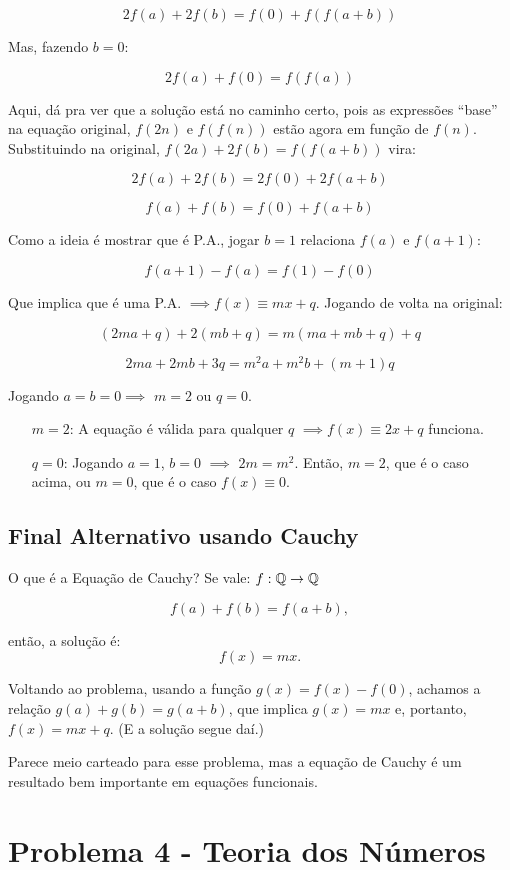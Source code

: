 \documentclass[10pt,a4paper]{article}
\begin{document}
	$$2f(a) + 2f(b) = f(0) + f(f(a+b))$$

	Mas, fazendo $b=0$:

	$$2f(a) + f(0) = f(f(a))$$

	Aqui, dá pra ver que a solução está no caminho certo, pois as expressões ``base'' na equação original, $f(2n)$ e $f(f(n))$ estão agora em função de $f(n)$. Substituindo na original, $f(2a) + 2f(b) = f(f(a + b))$ vira:

	$$2f(a) + 2f(b) = 2f(0) + 2f(a+b)$$

	$$f(a) + f(b) = f(0) + f(a+b)$$

	Como a ideia é mostrar que é P.A., jogar $b=1$ relaciona $f(a)$ e $f(a+1)$:

	$$f(a+1) - f(a) = f(1) - f(0)$$

	Que implica que é uma P.A. $\implies f(x) \equiv mx + q$. Jogando de volta na original:

	$$(2ma + q) + 2(mb + q) = m(ma + mb + q) + q$$

	$$2ma + 2mb + 3q = m^2a + m^2b + (m+1)q$$

	Jogando $a = b = 0 \implies$ $m = 2$ ou $q = 0$.

	\begin{itemize}
		\item[$m = 2$:] A equação é válida para qualquer $q$ $\implies f(x) \equiv 2x + q$ funciona.
		\item[$q = 0$:] Jogando $a = 1$, $b = 0$ $\implies$ $2m = m^2$. Então, $m=2$, que é o caso acima, ou $m=0$, que é o caso $f(x) \equiv 0$. 
	\end{itemize}

	\subsection*{Final Alternativo usando Cauchy}

	O que é a Equação de Cauchy? Se vale: $f : \mathbb{Q} \to \mathbb{Q}$

	$$f(a) + f(b) = f(a+b),$$

	então, a solução é:
	$$f(x) = mx.$$

	Voltando ao problema, usando a função $g(x) = f(x) - f(0)$, achamos a relação $g(a) + g(b) = g(a+b)$, que implica $g(x) = mx$ e, portanto, $f(x) = mx + q$. (E a solução segue daí.)

	Parece meio carteado para esse problema, mas a equação de Cauchy é um resultado bem importante em equações funcionais.

	\section*{Problema 4 - Teoria dos Números}
\end{document}
